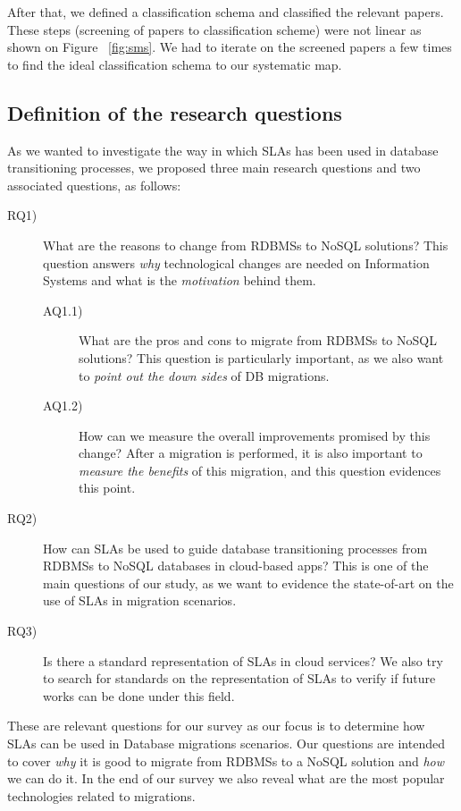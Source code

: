 \documentclass[]{tEIS2e}
\theoremstyle{plain}
\theoremstyle{remark}
\begin{document}
After that, we defined a classification schema and classified the relevant papers. These steps (screening of papers to classification scheme) were not linear as shown on Figure ~\ref{fig:sms}. We had to iterate on the screened papers a few times to find the ideal classification schema to our systematic map.

\subsection{Definition of the research questions}
\label{sec:drq}

As we wanted to investigate the way in which SLAs has been used in database transitioning processes, we proposed three main research questions and two associated questions, as follows:
\begin{description}
\item[RQ1)] What are the reasons to change from RDBMSs to NoSQL solutions? This question answers \textit{why} technological changes are needed on Information Systems and what is the \textit{motivation} behind them. 
  \begin{description}
  \item[AQ1.1)] What are the pros and cons to migrate from RDBMSs to NoSQL solutions? This question is particularly important, as we also want to \textit{point out the down sides} of DB migrations. 
  \item[AQ1.2)] How can we measure the overall improvements promised by this change? After a migration is performed, it is also important to \textit{measure the benefits} of this migration, and this question evidences this point. 
  \end{description}
\item[RQ2)] How can SLAs be used to guide database transitioning processes from RDBMSs to NoSQL databases in cloud-based apps? This is one of the main questions of our study, as we want to evidence the state-of-art on the use of SLAs in migration scenarios. 
\item[RQ3)] Is there a standard representation of SLAs in cloud services? We also try to search for standards on the representation of SLAs to verify if future works can be done under this field.
\end{description}

These are relevant questions for our survey as our focus is to determine how SLAs can be used in Database migrations scenarios. 
Our questions are intended to cover \textit{why} it is good to migrate from RDBMSs to a NoSQL solution and \textit{how} we can do it. In the end of our survey we also reveal what are the most popular technologies related to migrations.
\end{document}
